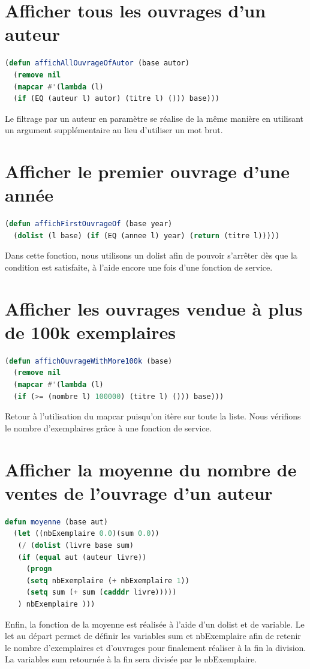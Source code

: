 \documentclass[a4paper,10pt]{report}
\begin{document}
\section{Afficher tous les ouvrages d'un auteur}	  
\begin{lstlisting}[language=Lisp]
(defun affichAllOuvrageOfAutor (base autor)
  (remove nil 
  (mapcar #'(lambda (l) 
  (if (EQ (auteur l) autor) (titre l) ())) base)))
\end{lstlisting}
Le filtrage par un auteur en paramètre se réalise de la même manière en utilisant un argument supplémentaire au lieu d’utiliser un mot brut.
\section{Afficher le premier ouvrage d'une année}	  

\begin{lstlisting}[language=Lisp]
(defun affichFirstOuvrageOf (base year)
  (dolist (l base) (if (EQ (annee l) year) (return (titre l)))))
\end{lstlisting}
Dans cette fonction, nous utilisons un dolist afin de pouvoir s’arrêter dès que la condition est satisfaite, à l’aide encore une fois d’une fonction de service.
\section{Afficher les ouvrages vendue à plus de 100k exemplaires}	  

\begin{lstlisting}[language=Lisp]
(defun affichOuvrageWithMore100k (base)
  (remove nil 
  (mapcar #'(lambda (l) 
  (if (>= (nombre l) 100000) (titre l) ())) base)))
\end{lstlisting}
Retour à l’utilisation du mapcar puisqu’on itère sur toute la liste. Nous vérifions le nombre d’exemplaires grâce à une fonction de service.\newpage
\section{Afficher la moyenne du nombre de ventes de l'ouvrage d'un auteur}	  
\begin{lstlisting}[language=Lisp]
defun moyenne (base aut)
  (let ((nbExemplaire 0.0)(sum 0.0))
   (/ (dolist (livre base sum)
   (if (equal aut (auteur livre))
     (progn 
     (setq nbExemplaire (+ nbExemplaire 1))
     (setq sum (+ sum (cadddr livre)))))
   ) nbExemplaire )))
\end{lstlisting}
Enfin, la fonction de la moyenne est réalisée à l’aide d’un dolist et de variable. Le let au départ permet de définir les variables sum et nbExemplaire afin de retenir le nombre d’exemplaires et d’ouvrages pour finalement réaliser à la fin la division. La variables sum retournée à la fin sera divisée par le nbExemplaire.
\end{document}
